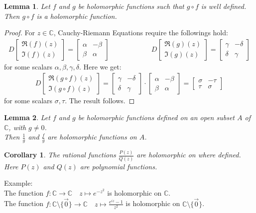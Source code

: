\documentclass[11pt,oneside]{book}
\theoremstyle{break}
\theoremstyle{break}
\newtheorem{lem}{Lemma}[thm]
\newtheorem{corL}{Corollary}[lem]
\newcommand{\Complex}{\mathbb{C}}
\newcommand{\bmat}[1]{\begin{bmatrix} #1 \end{bmatrix}}
\newcommand{\example}{\color{green}Example: \color{black}}
\begin{document}
\begin{lem}
Let $f$ and $g$ be holomorphic functions such that $g\circ f$ is well defined.\\ 
Then $g\circ f$ is a holomorphic function.
\end{lem}
\begin{proof}
For $z \in \Complex$, Cauchy-Riemann Equations require the followings hold:
\begin{align*}
D\bmat{\Re(f)(z) \\ \Im(f)(z)} = \bmat{\alpha &-\beta \\ \beta & \alpha} \qquad\qquad\qquad 
D\bmat{\Re(g)(z) \\ \Im(g)(z)} = \bmat{\gamma &-\delta \\ \delta & \gamma}
\end{align*}
for some scalars $\alpha,\beta,\gamma,\delta$. Here we get:
\begin{align*}
D\bmat{\Re(g\circ f)(z) \\ \Im(g\circ f)(z)} = \bmat{\gamma &-\delta \\ \delta & \gamma} \cdot \bmat{\alpha &-\beta \\ \beta & \alpha}  = \bmat{\sigma & -\tau \\ \tau & \sigma}
\end{align*}
for some scalars $\sigma,\tau$. The result follows.
\end{proof}

\begin{lem}
Let $f$ and $g$ be holomorphic functions defined on an open subset $A$ of $\Complex$, with $g\neq 0$. \\
Then $\frac{1}{g}$ and $\frac{f}{g}$ are holomorphic functions on $A$.
\end{lem}

\begin{corL}
The rational functions $\frac{P(z)}{Q(z)}$ are holomorphic on where defined. \\
Here $P(z)$ and $Q(z)$ are polynomial functions.
\end{corL}

\example \\
The function $f:\Complex \to \Complex  \quad z\mapsto e^{-z^2}$ is holomorphic on $\Complex$.\\
The function $f:\Complex \setminus \{\vec{0}\} \to \Complex  \quad z\mapsto \frac{e^{iz} -1}{z^2}$ is holomorphic on $\Complex \setminus \{\vec{0}\}$. 
\end{document}
